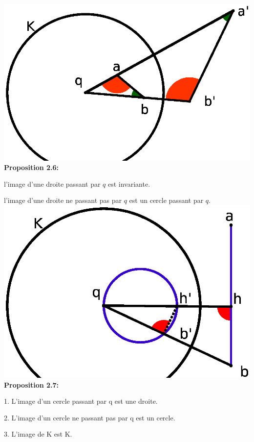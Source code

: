 \documentclass[a4paper, 12pt, twoside]{book}
\begin{document}
 
 
 \includegraphics[scale=0.5]{figures/mobius2.eps} \\
 
 
 \textbf{Proposition 2.6:} \
 
 l'image d'une droite passant par $q$ est invariante.\
 
 l'image d'une droite ne passant pas par $q$ est un cercle passant par $q$.\\
 
 \includegraphics[scale=0.7]{figures/mobius3.eps} \\
 
 
  \textbf{Proposition 2.7:} \
  
  1. L'image d'un cercle passant par q est une droite.\
  
  2. L'image d'un cercle ne passant pas par q est un cercle.\
  
  3. L'image de K est K.\\
  
\end{document}

